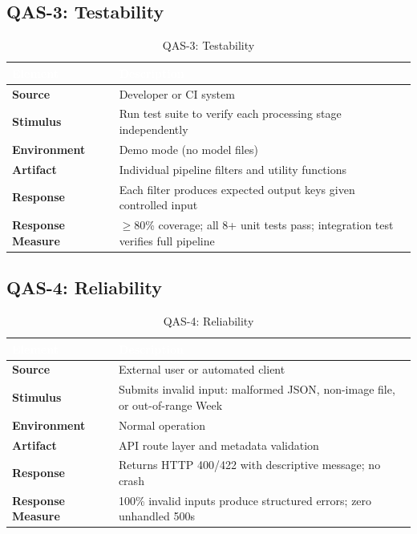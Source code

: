 \documentclass[11pt,a4paper,oneside]{report}
\begin{document}
\subsection{QAS-3: Testability}
\begin{table}[H]
\centering\footnotesize
\caption{QAS-3: Testability}
\label{tab:qas-test}
\begin{tabularx}{\textwidth}{>{\bfseries}p{2.5cm} X}
\toprule
\rowcolor{tableheader}
\textcolor{white}{Element} & \textcolor{white}{Description} \\
\midrule
Source          & Developer or CI system \\
Stimulus        & Run test suite to verify each processing stage independently \\
Environment     & Demo mode (no model files) \\
Artifact        & Individual pipeline filters and utility functions \\
Response        & Each filter produces expected output keys given controlled input \\
Response Measure & $\geq$80\% coverage; all 8+ unit tests pass; integration test verifies full pipeline \\
\bottomrule
\end{tabularx}
\end{table}

\subsection{QAS-4: Reliability}
\begin{table}[H]
\centering\footnotesize
\caption{QAS-4: Reliability}
\label{tab:qas-rel}
\begin{tabularx}{\textwidth}{>{\bfseries}p{2.5cm} X}
\toprule
\rowcolor{tableheader}
\textcolor{white}{Element} & \textcolor{white}{Description} \\
\midrule
Source          & External user or automated client \\
Stimulus        & Submits invalid input: malformed JSON, non-image file, or out-of-range Week \\
Environment     & Normal operation \\
Artifact        & API route layer and metadata validation \\
Response        & Returns HTTP 400/422 with descriptive message; no crash \\
Response Measure & 100\% invalid inputs produce structured errors; zero unhandled 500s \\
\bottomrule
\end{tabularx}
\end{table}
\end{document}
